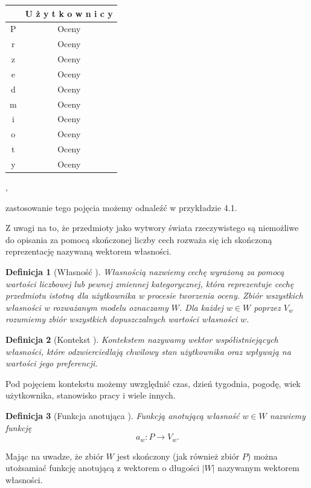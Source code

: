 \documentclass[12pt,a4paper]{report}
\newtheorem{df}{Definicja}[chapter]
\newcommand{\setPrzedmioty}{\mathit{P}}
\newcommand{\setWlasnosci}{\mathit{W}}
\begin{document}
\begin{center}
\begin{tabular}{|c|c|} \hline
 & U ż y t k o w n i c y  \\
\hline
\hline
P & Oceny \\
\hline
r & Oceny \\
\hline
z & Oceny  \\
\hline
e & Oceny \\
\hline
d & Oceny \\
\hline
m & Oceny \\
\hline
i & Oceny \\
\hline
o & Oceny \\
\hline
t & Oceny \\
\hline
y & Oceny \\
\hline
\end{tabular},
\end{center}
zastosowanie tego pojęcia możemy odnaleźć w przykładzie 4.1.
\bigskip

Z uwagi na to, że przedmioty jako wytwory świata rzeczywistego są niemożliwe do opisania za pomocą skończonej liczby cech  rozważa się ich skończoną reprezentację nazywaną wektorem własności.

\begin{df}[Własność {\citep[Sec 1.3]{kidzinski}}]
Własnością nazwiemy cechę wyrażoną za pomocą wartości liczbowej lub pewnej zmiennej kategorycznej, która reprezentuje cechę przedmiotu istotną dla użytkownika w procesie tworzenia oceny. Zbiór wszystkich własności w rozważanym modelu oznaczamy $\setWlasnosci$. Dla każdej $w \in \setWlasnosci$ poprzez $V_w$ rozumiemy zbiór wszystkich dopuszczalnych wartości własności $w$.
\end{df}

\begin{df}[Kontekst {\citep[Sec 3]{bre}}]
Kontekstem nazywamy wektor współistniejących własności, które odzwierciedlają chwilowy stan użytkownika oraz wpływają na wartości jego preferencji.
\end{df}

Pod pojęciem kontekstu możemy uwzględnić czas, dzień tygodnia, pogodę, wiek użytkownika, stanowisko pracy i wiele innych.

\begin{df}[Funkcja anotująca {\citep[Sec 1.3]{kidzinski}}]
Funkcją anotującą własność $w \in \setWlasnosci$ nazwiemy funkcję 
$$
a_w \colon \setPrzedmioty \to V_w.
$$
\end{df}

Mając na uwadze, że zbiór $\setWlasnosci$ jest skończony (jak również zbiór $\setPrzedmioty$) można utożsamiać funkcję anotującą z wektorem o długości $|\setWlasnosci|$ nazywanym wektorem własności.
\end{document}
